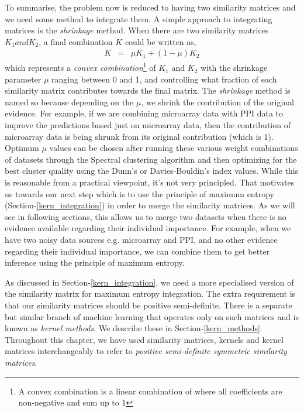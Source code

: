 To summarise, the problem now is reduced to having two similarity matrices and we need some method to integrate 
them. A simple approach to integrating matrices 
is the \textit{shrinkage} method. When there are two similarity matrices $K_{1} and K_{2}$, a final combination $K$ could be written as,
\begin{eqnarray}
K &=& \mu K_{1}+(1-\mu)K_{2}
\end{eqnarray}
which represents a \textit{convex combination}\footnote{A convex combination is a linear combination of where all coefficients are non-negative and sum up to 1} 
of $K_{1}$ and $K_{2}$ with the shrinkage parameter $\mu$ ranging between 0 and 1, and controlling what fraction of each similarity matrix contributes 
towards the final matrix. The \textit{shrinkage} method is named so because depending on the $\mu$, we shrink the 
contribution of the original evidence. For example, if we are combining microarray data with \ac{PPI} data to improve the predictions based just on 
microarray data, then the contribution of microarray data is being shrunk from its original contribution (which is 1). Optimum $\mu$ values can be chosen after 
running these various weight combinations of datasets through the Spectral clustering algorithm and then optimizing for the best cluster quality using the Dunn's 
or Davies-Bouldin's index values. While this is reasonable from a practical viewpoint, it's not very principled. That motivates us towards our next step which is to use 
the principle of maximum entropy (Section-\ref{kern_integration}) in order to merge the similarity matrices. As we will see in following sections, this allows 
us to merge two datasets when there is no evidence available regarding their individual importance. For example, when we have two noisy data sources e.g. 
microarray and \ac{PPI}, and no other evidence regarding their individual importance, we can combine them to get better inference using the principle 
of maximum entropy.

As discussed in Section-\ref{kern_integration}, we need a more specialised version of the similarity matrix for maximum entropy integration. The extra requirement is that 
our similarity matrices should be positive semi-definite. There is a separate but similar branch of machine learning that operates only on such matrices and is 
known as \textit{kernel methods}. We describe these in Section-\ref{kern_methods}. Throughout this chapter, we have used similarity matrices, kernels and kernel 
matrices interchangeably to refer to \textit{positive semi-definite symmetric similarity matrices}.

